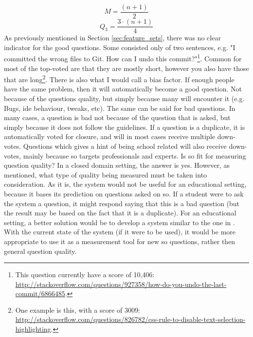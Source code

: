 \begin{equation}\label{eq:quartile2}
M = \frac{(n + 1)}{2}
\end{equation}
\begin{equation}\label{eq:quartile3}
Q_{3} = \frac{3 \cdot (n + 1)}{4}
\end{equation}
As previously mentioned in Section \ref{sec:feature_sets}, there was no clear indicator for the good questions. 
Some consisted only of two sentences, e.g. "I committed the wrong files to Git. How can I undo this commit?"\footnote{
	This question currently have a score of 10,406: \\ 
	\url{http://stackoverflow.com/questions/927358/how-do-you-undo-the-last-commit/6866485}.
}. Common for most of the top-voted are that they are mostly short, however you also have those that are long\footnote{
	One example is this, with a score of 3009: \\
	\url{http://stackoverflow.com/questions/826782/css-rule-to-disable-text-selection-highlighting}.
}.
There is also what I would call a bias factor. 
If enough people have the same problem, then it will automatically become a good question. 
Not because of the questions quality, but simply because many will encounter it (e.g. Bugs, \gls{ide} behaviour, tweaks, etc).
The same can be said for bad questions. 
In many cases, a question is bad not because of the question that is asked, but simply because it does not follow the guidelines. 
If a question is a duplicate, it is automatically voted for closure, and will in most cases receive multiple down-votes. 
Questions which gives a hint of being school related will also receive down-votes, mainly because \gls{so} targets professionals and experts. 
\vspace{0.5em}\newline
Is \gls{so} fit for measuring question quality?
In a closed domain setting, the answer is yes. 
However, as mentioned, what type of quality being measured must be taken into consideration. 
As it is, the system would not be useful for an educational setting, because it bases its prediction on questions asked on \gls{so}.
If a student were to ask the system a question, it might respond saying that this is a bad question (but the result may be based on the fact that it is a duplicate).
For an educational setting, a better solution would be to develop a system similar to the one in \cite{Lezina2013}.
With the current state of the system (if it were to be used), it would be more appropriate to use it as a measurement tool for new \gls{so} questions, rather then general question quality.

